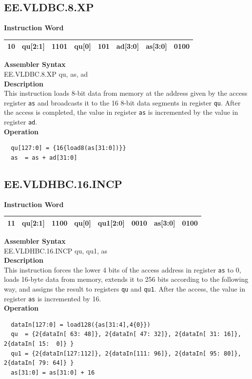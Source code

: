 \clearpage
\subsection{EE.VLDBC.8.XP}\label{instruction:EEVLDBC8XP}
\setlength\tabcolsep{6pt}
\textbf{Instruction Word} \\
\begin{tabular}{|c|c|c|c|c|c|c|c|}
	\hline
	10 & qu[2:1] & 1101 & qu[0] & 101 & ad[3:0] & as[3:0] & 0100 \\
	\hline
\end{tabular}

\textbf{Assembler Syntax} \\
EE.VLDBC.8.XP qu, as, ad \\
\textbf{Description} \\
This instruction loads 8-bit data from memory at the address given by the access register \lstinline{as} and broadcasts it to the 16 8-bit data segments in register \lstinline{qu}. After the access is completed, the value in register \lstinline{as} is incremented by the value in register \lstinline{ad}.\\
\textbf{Operation}
\begin{lstlisting}
  qu[127:0] = {16{load8(as[31:0])}}
  as  = as + ad[31:0]
\end{lstlisting}

\clearpage
\subsection{EE.VLDHBC.16.INCP}\label{instruction:EEVLDHBC16INCP}
\setlength\tabcolsep{6pt}
\textbf{Instruction Word} \\
\begin{tabular}{|c|c|c|c|c|c|c|c|}
	\hline
	11 & qu[2:1] & 1100 & qu[0] & qu1[2:0] & 0010 & as[3:0] & 0100 \\
	\hline
\end{tabular}

\textbf{Assembler Syntax} \\
EE.VLDHBC.16.INCP qu, qu1, as \\
\textbf{Description} \\
This instruction forces the lower 4 bits of the access address in register \lstinline{as} to 0, loads 16-byte data from memory, extends it to 256 bits according to the following way, and assigns the result to registers \lstinline{qu} and \lstinline{qu1}. After the access, the value in register \lstinline{as} is incremented by 16.\\
\textbf{Operation}
\begin{lstlisting}
  dataIn[127:0] = load128({as[31:4],4{0}})
  qu  = {2{dataIn[ 63: 48]}, 2{dataIn[ 47: 32]}, 2{dataIn[ 31: 16]}, 2{dataIn[ 15:  0]} }
  qu1 = {2{dataIn[127:112]}, 2{dataIn[111: 96]}, 2{dataIn[ 95: 80]}, 2{dataIn[ 79: 64]} }
  as[31:0] = as[31:0] + 16
\end{lstlisting}

